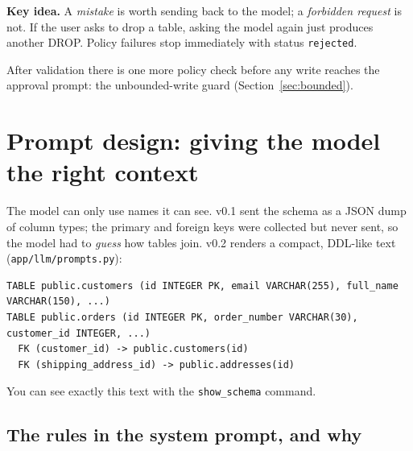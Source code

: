 \documentclass[11pt,a4paper]{article}
\newcommand{\keyidea}[1]{%
  \par\smallskip\noindent\colorbox{notebg}{\parbox{\dimexpr\linewidth-2\fboxsep}{\small\textbf{Key idea.} #1}}\par\smallskip}
\begin{document}
\keyidea{A \emph{mistake} is worth sending back to the model; a
\emph{forbidden request} is not. If the user asks to drop a table, asking the
model again just produces another DROP. Policy failures stop immediately with
status \texttt{rejected}.}

After validation there is one more policy check before any write reaches
the approval prompt: the unbounded-write guard (Section~\ref{sec:bounded}).

\section{Prompt design: giving the model the right context}
\label{sec:prompt}

The model can only use names it can see. v0.1 sent the schema as a JSON
dump of column types; the primary and foreign keys were collected but never
sent, so the model had to \emph{guess} how tables join.
v0.2 renders a compact, DDL-like text (\texttt{app/llm/prompts.py}):

\begin{lstlisting}
TABLE public.customers (id INTEGER PK, email VARCHAR(255), full_name VARCHAR(150), ...)
TABLE public.orders (id INTEGER PK, order_number VARCHAR(30), customer_id INTEGER, ...)
  FK (customer_id) -> public.customers(id)
  FK (shipping_address_id) -> public.addresses(id)
\end{lstlisting}

You can see exactly this text with the \texttt{show\_schema} command.

\subsection*{The rules in the system prompt, and why}
\end{document}
